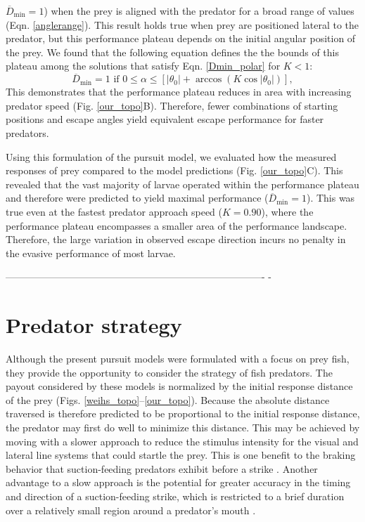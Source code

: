 \documentclass[12pt]{article}
\newcommand{\ol}{\overline}
\begin{document}
$\ol D_{\text{min}}=1$) when the prey is aligned with the predator for a broad
range of values (Eqn. \ref{anglerange}). This result holds true when prey are
positioned lateral to the predator, but this performance plateau depends on the
initial angular position of the prey. We found that the following equation
defines the  the bounds of this plateau among the solutions that satisfy Eqn.
\ref{Dmin_polar} for $K<1$:
%
\begin{equation}
\ol D_{\text{min}}=1 \text{ if }  0 \leq \alpha  \leq  [|\theta_0 |  +
\arccos(K \cos | \theta_0 |)],
 \end{equation}
%
This demonstrates that the performance plateau reduces in area with increasing
predator speed (Fig. \ref{our_topo}B). Therefore, fewer combinations of
starting positions and escape angles yield equivalent escape performance for
faster predators.

Using this formulation of the pursuit model, we evaluated how the measured
responses of prey compared to the model predictions (Fig. \ref{our_topo}C).
This revealed that the vast majority of larvae operated within the performance
plateau and therefore were predicted to yield maximal performance ($\ol
D_{\text{min}}=1$). This was true even at the fastest predator approach speed
($K=0.90$), where the performance plateau encompasses a smaller area of the
performance landscape. Therefore, the large variation in observed escape
direction incurs no penalty in the evasive performance of most larvae. 


%
-------------------------------------------------------------------------------
-
\section{Predator strategy}

Although the present pursuit models were formulated with a focus on prey fish,
they provide the opportunity to consider the strategy of fish predators. The
payout considered by these models is normalized by the initial response
distance of the prey (Figs. \ref{weihs_topo}--\ref{our_topo}). Because the
absolute distance traversed is therefore predicted to be proportional to the
initial response distance, the predator may first do well to minimize this
distance. This may be achieved by moving with a slower approach to reduce the
stimulus intensity for the visual \citep{Dill:1974ws} and lateral line
\citep{Stewart:2014cm} systems that could startle the prey. This is one benefit
to the braking behavior that suction-feeding predators exhibit before a strike
\citep{Higham:2007go, Higham:2005iu}. Another advantage to a slow approach is
the potential for greater accuracy in the timing and direction of a
suction-feeding strike, which is restricted to a brief duration over a
relatively small region around a predator's mouth \citep{Wainwright:2001ufa}.
\end{document}
